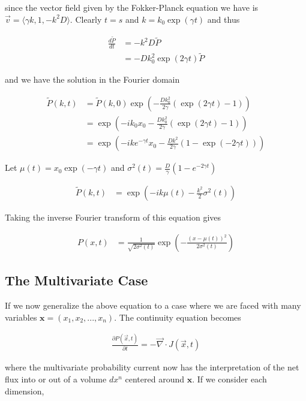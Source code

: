 \documentclass{article}
\begin{document}
since the vector field given by the Fokker-Planck equation we have is $\vec{v} = \langle \gamma k, 1, -k^{2}D\rangle$. Clearly $t=s$ and $k = k_{0}\exp(\gamma t)$ and thus

\begin{align}
\frac{d\tilde{P}}{dt} &= -k^{2}D\tilde{P}\\
&= -Dk_{0}^{2}\exp(2\gamma t)\tilde{P}
\end{align}

and we have the solution in the Fourier domain

\begin{align}
\tilde{P}(k,t) &= \tilde{P}(k,0)\exp\left(-\frac{Dk_{0}^{2}}{2\gamma}(\exp(2\gamma t)-1)\right)\\
&= \exp\left(-ik_{0} x_{0} -\frac{Dk_{0}^{2}}{2\gamma}(\exp(2\gamma t)-1)\right)\\
&= \exp\left(-i k e^{-\gamma t} x_{0} -\frac{Dk^{2}}{2\gamma}(1-\exp(-2\gamma t))\right)
\end{align}

Let $\mu(t) = x_{0}\exp(-\gamma t)$ and $\sigma^{2}(t) = \frac{D}{\gamma}(1-e^{-2\gamma t})$

\begin{align}
\tilde{P}(k,t) &= \exp\left(-i k \mu(t) -\frac{k^{2}}{2}\sigma^{2}(t)\right)
\end{align}

Taking the inverse Fourier transform of this equation gives 


\begin{align}
P(x,t) &= \frac{1}{\sqrt{2\sigma^{2}(t)}}\exp\left(-\frac{(x-\mu(t))^{2}}{2\sigma^{2}(t)}\right)
\end{align}

\subsection{The Multivariate Case}

If we now generalize the above equation to a case where we are faced with many variables $\bm{x} = (x_{1},x_{2},...,x_{n})$. The continuity equation becomes 

\begin{align}
\frac{\partial P(\vec{x},t)}{\partial t} = -\vec{\nabla} \cdot J(\vec{x},t)
\end{align}

where the multivariate probability current now has the interpretation of the net flux into or out of a volume $dx^{n}$ centered around $\bm{x}$. If we consider each dimension, 
\end{document}
